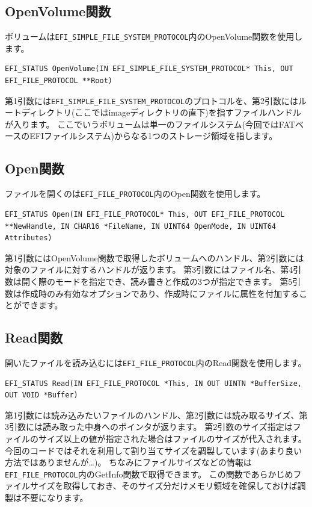 \documentclass[10pt,b5paper,twoside,openany]{ltjsbook}
\begin{document}
\subsection{OpenVolume関数}
ボリュームは\verb+EFI_SIMPLE_FILE_SYSTEM_PROTOCOL+内のOpenVolume関数を使用します。
\begin{lstlisting}[style=customC]
EFI_STATUS OpenVolume(IN EFI_SIMPLE_FILE_SYSTEM_PROTOCOL* This, OUT EFI_FILE_PROTOCOL **Root)
\end{lstlisting}
第1引数には\verb+EFI_SIMPLE_FILE_SYSTEM_PROTOCOL+のプロトコルを、第2引数にはルートディレクトリ(ここではimageディレクトリの直下)を指すファイルハンドルが入ります。
ここでいうボリュームは単一のファイルシステム(今回ではFATベースのEFIファイルシステム)からなる1つのストレージ領域を指します。

\subsection{Open関数}
ファイルを開くのは\verb+EFI_FILE_PROTOCOL+内のOpen関数を使用します。
\begin{lstlisting}[style=customC]
EFI_STATUS Open(IN EFI_FILE_PROTOCOL* This, OUT EFI_FILE_PROTOCOL **NewHandle, IN CHAR16 *FileName, IN UINT64 OpenMode, IN UINT64 Attributes)
\end{lstlisting}
第1引数にはOpenVolume関数で取得したボリュームへのハンドル、第2引数には対象のファイルに対するハンドルが返ります。
第3引数にはファイル名、第4引数は開く際のモードを指定でき、読み書きと作成の3つが指定できます。
第5引数は作成時のみ有効なオプションであり、作成時にファイルに属性を付加することができます。

\subsection{Read関数}
開いたファイルを読み込むには\verb+EFI_FILE_PROTOCOL+内のRead関数を使用します。
\begin{lstlisting}[style=customC]
    EFI_STATUS Read(IN EFI_FILE_PROTOCOL *This, IN OUT UINTN *BufferSize, OUT VOID *Buffer)
\end{lstlisting}
第1引数には読み込みたいファイルのハンドル、第2引数には読み取るサイズ、第3引数には読み取った中身へのポインタが返ります。
第2引数のサイズ指定はファイルのサイズ以上の値が指定された場合はファイルのサイズが代入されます。
今回のコードではそれを利用して割り当てサイズを調製しています(あまり良い方法ではありませんが…)。
ちなみにファイルサイズなどの情報は\verb+EFI_FILE_PROTOCOL+内のGetInfo関数で取得できます。
この関数であらかじめファイルサイズを取得しておき、そのサイズ分だけメモリ領域を確保しておけば調製は不要になります。
\end{document}
